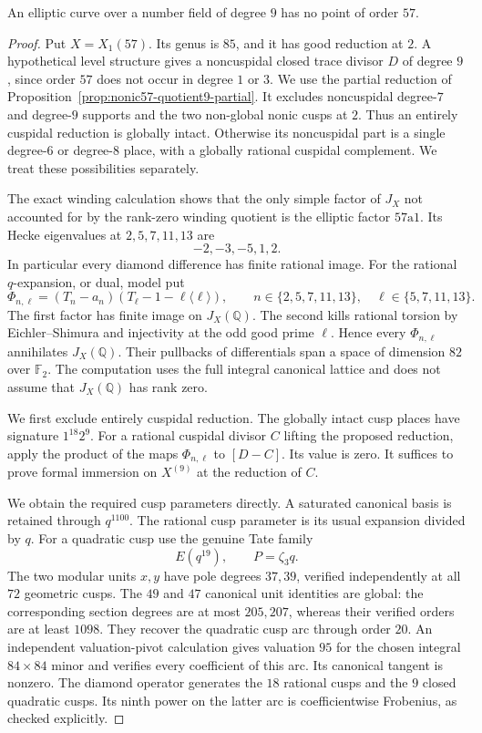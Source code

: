 \begin{proposition}\label{prop:nonic57-exclusion}
An elliptic curve over a number field of degree $9$ has no point
of order $57$.
\end{proposition}
\begin{proof}
Put $X=X_1(57)$. Its genus is $85$, and it has good reduction at
$2$. A hypothetical level structure gives a noncuspidal closed
trace divisor $D$ of degree $9$, since order $57$ does not occur
in degree $1$ or $3$.
We use the partial reduction of
Proposition~\ref{prop:nonic57-quotient9-partial}.
It excludes noncuspidal degree-$7$ and degree-$9$ supports and
the two non-global nonic cusps at $2$.
Thus an entirely cuspidal reduction is globally intact.
Otherwise its noncuspidal part is a single degree-$6$ or
degree-$8$ place, with a globally rational cuspidal complement.
We treat these possibilities separately.

The exact winding calculation shows that the only simple factor
of $J_X$ not accounted for by the rank-zero winding quotient is
the elliptic factor $57\mathrm a1$.
Its Hecke eigenvalues at $2,5,7,11,13$ are
\[
 -2,-3,-5,1,2.
\]
In particular every diamond difference has finite rational image.
For the rational $q$-expansion, or dual, model put
\[
 \Phi_{n,\ell}=(T_n-a_n)
       (T_\ell-1-\ell\langle\ell\rangle),\qquad
 n\in\{2,5,7,11,13\},\quad \ell\in\{5,7,11,13\}.
\]
The first factor has finite image on $J_X(\mathbb Q)$.
The second kills rational torsion by Eichler--Shimura and
injectivity at the odd good prime $\ell$.
Hence every $\Phi_{n,\ell}$ annihilates $J_X(\mathbb Q)$.
Their pullbacks of differentials span a space of dimension $82$
over $\mathbb F_2$. The computation uses the full integral
canonical lattice and does not assume that $J_X(\mathbb Q)$
has rank zero.

We first exclude entirely cuspidal reduction.
The globally intact cusp places have signature $1^{18}2^9$.
For a rational cuspidal divisor $C$ lifting the proposed
reduction, apply the product of the maps $\Phi_{n,\ell}$ to
$[D-C]$. Its value is zero.
It suffices to prove formal immersion on $X^{(9)}$ at the
reduction of $C$.

We obtain the required cusp parameters directly.
A saturated canonical basis is retained through $q^{1100}$.
The rational cusp parameter is its usual expansion divided by
$q$. For a quadratic cusp use the genuine Tate family
\[
 E(q^{19}),\qquad P=\zeta_3q.
\]
The two modular units $x,y$ have pole degrees $37,39$,
verified independently at all $72$ geometric cusps.
The $49$ and $47$ canonical unit identities are global:
the corresponding section degrees are at most $205,207$,
whereas their verified orders are at least $1098$.
They recover the quadratic cusp arc through order $20$.
An independent valuation-pivot calculation gives valuation $95$
for the chosen integral $84\times84$ minor and verifies every
coefficient of this arc. Its canonical tangent is nonzero.
The diamond operator generates the $18$ rational cusps and the
$9$ closed quadratic cusps. Its ninth power on the latter arc
is coefficientwise Frobenius, as checked explicitly.


\end{proof}
